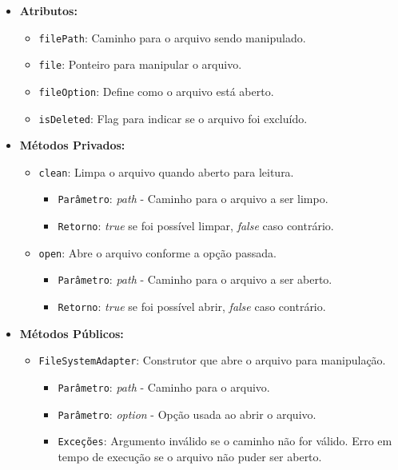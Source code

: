 \documentclass[
    12pt,				%
    oneside,   	        %
    a4paper,			%
    english,			%
    french,				%
    spanish,			%
    brazil,				%
    ]{pacotes/abntex2}
\begin{document}
\begin{itemize}
    \item \textbf{Atributos:}
        \begin{itemize}
            \item \texttt{filePath}: Caminho para o arquivo sendo manipulado.
            \item \texttt{file}: Ponteiro para manipular o arquivo.
            \item \texttt{fileOption}: Define como o arquivo est\'a aberto.
            \item \texttt{isDeleted}: Flag para indicar se o arquivo foi exclu\'ido.
        \end{itemize}
    \item \textbf{M\'etodos Privados:}
        \begin{itemize}
            \item \texttt{clean}: Limpa o arquivo quando aberto para leitura.
            \begin{itemize}
                \item \texttt{Par\^ametro}: \textit{path} - Caminho para o arquivo a ser limpo.
                \item \texttt{Retorno}: \textit{true} se foi poss\'ivel limpar, \textit{false} caso contr\'ario.
            \end{itemize}
            
            \item \texttt{open}: Abre o arquivo conforme a op\c{c}\~ao passada.
            \begin{itemize}
                \item \texttt{Par\^ametro}: \textit{path} - Caminho para o arquivo a ser aberto.
                \item \texttt{Retorno}: \textit{true} se foi poss\'ivel abrir, \textit{false} caso contr\'ario.
            \end{itemize}
        \end{itemize}
    \item \textbf{M\'etodos P\'ublicos:}
        \begin{itemize}
            \item \texttt{FileSystemAdapter}: Construtor que abre o arquivo para manipula\c{c}\~ao.
            \begin{itemize}
                \item \texttt{Par\^ametro}: \textit{path} - Caminho para o arquivo.
                \item \texttt{Par\^ametro}: \textit{option} - Op\c{c}\~ao usada ao abrir o arquivo.
                \item \texttt{Exce\c{c}\~oes}: Argumento inv\'alido se o caminho n\~ao for v\'alido. Erro em tempo de execu\c{c}\~ao se o arquivo n\~ao puder ser aberto.
            \end{itemize}
            

\end{itemize}
\end{itemize}
\end{document}

